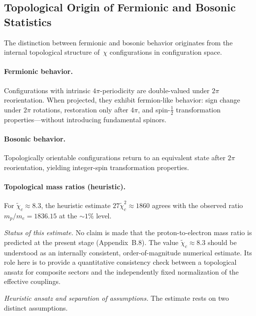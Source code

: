 \subsection{Topological Origin of Fermionic and Bosonic Statistics}
  \label{app:relational_spin_statistics}

  The distinction between fermionic and bosonic behavior originates from
  the internal topological structure of~$\chi$ configurations in
  configuration space.

  \paragraph{Fermionic behavior.}
    Configurations with intrinsic $4\pi$-periodicity are double-valued under
    $2\pi$ reorientation.
    When projected, they exhibit fermion-like behavior: sign change under
    $2\pi$ rotations, restoration only after $4\pi$, and
    spin-$\tfrac{1}{2}$ transformation properties---without introducing
    fundamental spinors.

  \paragraph{Bosonic behavior.}
    Topologically orientable configurations return to an equivalent state
    after $2\pi$ reorientation, yielding integer-spin transformation
    properties.

  \paragraph{Topological mass ratios (heuristic).}
    For $\tilde{\chi}_c \approx 8.3$, the heuristic estimate
    $27\tilde{\chi}_c^2 \approx 1860$ agrees with the observed ratio
    $m_p/m_e = 1836.15$ at the $\sim\!1\%$ level.

    \medskip
    \noindent\textit{Status of this estimate.}
    No claim is made that the proton-to-electron mass ratio is predicted at the present
    stage (Appendix~B.8).
    The value $\tilde{\chi}_c \approx 8.3$ should be understood as an internally
    consistent, order-of-magnitude numerical estimate.
    Its role here is to provide a quantitative consistency check between a topological
    ansatz for composite sectors and the independently fixed normalization of the
    effective couplings.

    \medskip
    \noindent\textit{Heuristic ansatz and separation of assumptions.}
    The estimate rests on two distinct assumptions.


